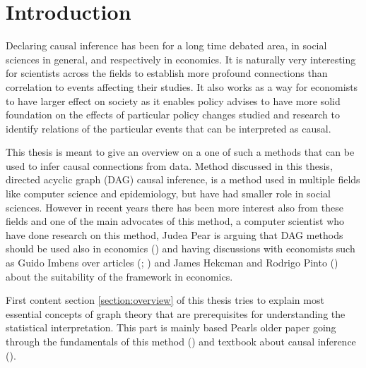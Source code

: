 \documentclass[main=english,12pt,a4paper,pdftex,econ,utf8]{aaltothesis}
\begin{document}


\section{Introduction}

Declaring causal inference has been for a long time debated area, in social sciences in general, and respectively in economics. It is naturally very interesting for scientists across the fields to establish more profound connections than correlation to events affecting their studies. It also works as a way for economists to have larger effect on society as it enables policy advises to have more solid foundation on the effects of particular policy changes studied and research to identify relations of the particular events that can be interpreted as causal.

This thesis is meant to give an overview on a one of such a methods that can be used to infer causal connections from data. Method discussed in this thesis, directed acyclic graph (DAG) causal inference, is a method used in multiple fields like computer science and epidemiology, but have had smaller role in social sciences. However in recent years there has been more interest also from these fields and one of the main advocates of this method, a computer scientist who have done research on this method, Judea Pear is arguing that DAG methods should be used also in economics (\cite{pearl_2014}) and having discussions with economists such as Guido Imbens over articles (\cite{Imbens2014}; \cite{imbes2020}) and James Hekcman and Rodrigo Pinto (\cite{Heckman2015}) about the suitability of the framework in economics.

First content section \ref{section:overview} of this thesis tries to explain most essential concepts of graph theory that are prerequisites for understanding the statistical interpretation. This part is mainly based Pearls older paper going through the fundamentals of this method (\cite{Pearl1998}) and textbook about causal inference (\cite{Peters2017}).
\end{document}
